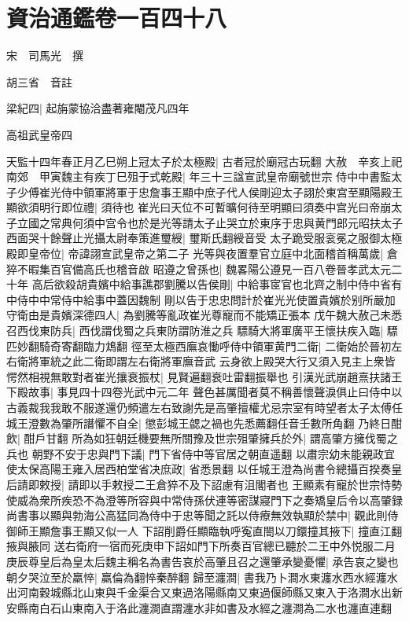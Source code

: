 \chapter{資治通鑑卷一百四十八}
宋　司馬光　撰

胡三省　音註

梁紀四|{
	起旃蒙協洽盡著雍閹茂凡四年}


高祖武皇帝四

天監十四年春正月乙巳朔上冠太子於太極殿|{
	古者冠於廟冠古玩翻}
大赦　辛亥上祀南郊　甲寅魏主有疾丁巳殂于式乾殿|{
	年三十三諡宣武皇帝廟號世宗}
侍中中書監太子少傅崔光侍中領軍將軍于忠詹事王顯中庶子代人侯剛迎太子詡於東宫至顯陽殿王顯欲須明行即位禮|{
	須待也}
崔光曰天位不可暫曠何待至明顯曰須奏中宫光曰帝崩太子立國之常典何須中宫令也於是光等請太子止哭立於東序于忠與黄門郎元昭扶太子西面哭十餘聲止光攝太尉奉策進璽綬|{
	璽斯氏翻綬音受}
太子跪受服衮冕之服御太極殿即皇帝位|{
	帝諱詡宣武皇帝之第二子}
光等與夜置羣官立庭中北面稽首稱萬歲|{
	倉猝不暇集百官備高氏也稽音啟}
昭遵之曾孫也|{
	魏畧陽公遵見一百八卷晉孝武太元二十年}
高后欲殺胡貴嬪中給事譙郡劉騰以告侯剛|{
	中給事宧官也北齊之制中侍中省有中侍中中常侍中給事中蓋因魏制}
剛以告于忠忠問計於崔光光使置貴嬪於别所嚴加守衛由是貴嬪深德四人|{
	為劉騰等亂政崔光尊寵而不能矯正張本}
戊午魏大赦己未悉召西伐東防兵|{
	西伐謂伐蜀之兵東防謂防淮之兵}
驃騎大將軍廣平王懷扶疾入臨|{
	驃匹妙翻騎奇寄翻臨力鴆翻}
徑至太極西廡哀慟呼侍中領軍黄門二衛|{
	二衛始於晉初左右衛將軍統之此二衛即謂左右衛將軍廡音武}
云身欲上殿哭大行又須入見主上衆皆愕然相視無敢對者崔光攘衰振杖|{
	見賢遍翻衰吐雷翻振舉也}
引漢光武崩趙熹扶諸王下殿故事|{
	事見四十四卷光武中元二年}
聲色甚厲聞者莫不稱善懷聲淚俱止曰侍中以古義裁我我敢不服遂還仍頻遣左右致謝先是高肇擅權尤忌宗室有時望者太子太傅任城王澄數為肇所譖懼不自全|{
	懲彭城王勰之禍也先悉薦翻任音壬數所角翻}
乃終日酣飲|{
	酣戶甘翻}
所為如狂朝廷機要無所關豫及世宗殂肇擁兵於外|{
	謂高肇方擁伐蜀之兵也}
朝野不安于忠與門下議|{
	門下省侍中等官居之朝直遥翻}
以肅宗幼未能親政宜使太保高陽王雍入居西柏堂省决庶政|{
	省悉景翻}
以任城王澄為尚書令總攝百揆奏皇后請即敕授|{
	請即以手敕授二王倉猝不及下詔慮有沮閣者也}
王顯素有寵於世宗恃勢使威為衆所疾恐不為澄等所容與中常侍孫伏連等密謀寢門下之奏矯皇后令以高肇録尚書事以顯與勃海公高猛同為侍中于忠等聞之託以侍療無效執顯於禁中|{
	觀此則侍御師王顯詹事王顯又似一人}
下詔削爵任顯臨執呼寃直閤以刀鐶撞其掖下|{
	撞直江翻掖與腋同}
送右衛府一宿而死庚申下詔如門下所奏百官總已聽於二王中外悦服二月庚辰尊皇后為皇太后魏主稱名為書告哀於高肇且召之還肇承變憂懼|{
	承告哀之變也}
朝夕哭泣至於羸悴|{
	羸倫為翻悴秦醉翻}
歸至瀍澗|{
	書我乃卜澗水東瀍水西水經瀍水出河南穀城縣北山東與千金渠合又東過洛陽縣南又東過偃師縣又東入于洛澗水出新安縣南白石山東南入于洛此瀍澗直謂瀍水非如書及水經之瀍澗為二水也瀍直連翻}
